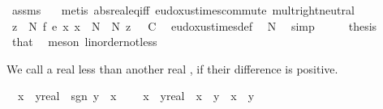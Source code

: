 \begin{isabellebody}
\ assms\ {\isacharasterisk}{\kern0pt}\ \isamarkupfalse%
\ {\isacharparenleft}{\kern0pt}metis\ abs{\isacharunderscore}{\kern0pt}real{\isacharunderscore}{\kern0pt}eq{\isacharunderscore}{\kern0pt}iff\ eudoxus{\isacharunderscore}{\kern0pt}times{\isacharunderscore}{\kern0pt}commute\ mult{\isachardot}{\kern0pt}right{\isacharunderscore}{\kern0pt}neutral{\isacharparenright}{\kern0pt}\isanewline
\ \ \isamarkupfalse%
\ \isamarkupfalse%
\ {\isachardoublequoteopen}{\isasymforall}z\ {\isacharless}{\kern0pt}\ N{\isachardot}{\kern0pt}\ {\isacharparenleft}{\kern0pt}f\ {\isacharasterisk}{\kern0pt}\isactrlsub e\ {\isacharparenleft}{\kern0pt}{\isasymlambda}x{\isachardot}{\kern0pt}\ x\ {\isacharplus}{\kern0pt}\ N{\isacharprime}{\kern0pt}\ {\isacharminus}{\kern0pt}\ N{\isacharparenright}{\kern0pt}{\isacharparenright}{\kern0pt}\ z\ {\isachargreater}{\kern0pt}\ {\isacharminus}{\kern0pt}\ C{\isachardoublequoteclose}\ \isamarkupfalse%
\ eudoxus{\isacharunderscore}{\kern0pt}times{\isacharunderscore}{\kern0pt}def\ \isamarkupfalse%
\ N{\isacharprime}{\kern0pt}\ \isamarkupfalse%
\ simp\isanewline
\ \ \isamarkupfalse%
\ \isamarkupfalse%
\ {\isacharquery}{\kern0pt}thesis\ \isamarkupfalse%
\ that\ \isamarkupfalse%
\ {\isacharparenleft}{\kern0pt}meson\ linorder{\isacharunderscore}{\kern0pt}not{\isacharunderscore}{\kern0pt}less{\isacharparenright}{\kern0pt}\isanewline
{}\isamarkupfalse%
%
\endisatagproof
{\isafoldproof}%
%
\isadelimproof
%
\endisadelimproof
%
\begin{isamarkuptext}%
We call a real  less than another real , if their difference is positive.%
\end{isamarkuptext}\isamarkuptrue%
\isamarkupfalse%
\isanewline
\ \ {\isachardoublequoteopen}x\ {\isacharless}{\kern0pt}\ {\isacharparenleft}{\kern0pt}y{\isacharcolon}{\kern0pt}{\isacharcolon}{\kern0pt}real{\isacharparenright}{\kern0pt}\ {\isasymequiv}\ sgn\ {\isacharparenleft}{\kern0pt}y\ {\isacharminus}{\kern0pt}\ x{\isacharparenright}{\kern0pt}\ {\isacharequal}{\kern0pt}\ {}{\isachardoublequoteclose}\isanewline
\isanewline
{}\isamarkupfalse%
\isanewline
\ \ {\isachardoublequoteopen}x\ {\isasymle}\ {\isacharparenleft}{\kern0pt}y{\isacharcolon}{\kern0pt}{\isacharcolon}{\kern0pt}real{\isacharparenright}{\kern0pt}\ {\isasymequiv}\ x\ {\isacharless}{\kern0pt}\ y\ {\isasymor}\ x\ {\isacharequal}{\kern0pt}\ y{\isachardoublequoteclose}\isanewline

\end{isabellebody}
